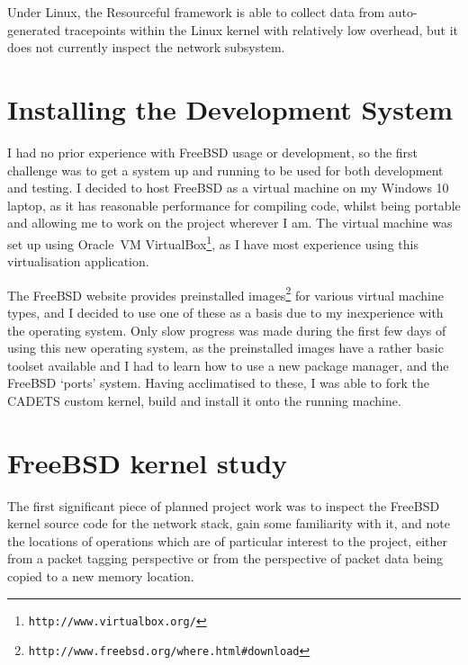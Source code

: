 \documentclass[a4paper,12pt,twoside,openright]{report}
\begin{document}
	Under Linux, the Resourceful framework is able to collect data from auto-generated tracepoints	within the Linux kernel with relatively low overhead, but it does not currently inspect the network subsystem.
	
	\section{Installing the Development System}
	
	I had no prior experience with FreeBSD usage or development, so the first challenge was to get a system up and running to be used for both development and testing. I decided to host FreeBSD as a virtual machine on my Windows 10 laptop, as it has reasonable performance for compiling code, whilst being portable and allowing me to work on the project wherever I am. The virtual machine was set up using Oracle\texttrademark\ VM VirtualBox\footnote{\texttt{http://www.virtualbox.org/}}, as I have most experience using this virtualisation application.
	
	The FreeBSD website provides preinstalled images\footnote{\texttt{http://www.freebsd.org/where.html\#download}} for various virtual machine types, and I decided to use one of these as a basis due to my inexperience with the operating system. Only slow progress was made during the first few days of using this new operating system, as the preinstalled images have a rather basic toolset available and I had to learn how to use a new package manager, and the FreeBSD `ports' system. Having acclimatised to these, I was able to fork the CADETS custom kernel, build and install it onto the running machine.
	
	\section{FreeBSD kernel study}
	
	The first significant piece of planned project work was to inspect the FreeBSD kernel source code for the network stack, gain some familiarity with it, and note the locations of operations which are of particular interest to the project, either from a packet tagging perspective or from the perspective of packet data being copied to a new memory location.
	
\end{document}
